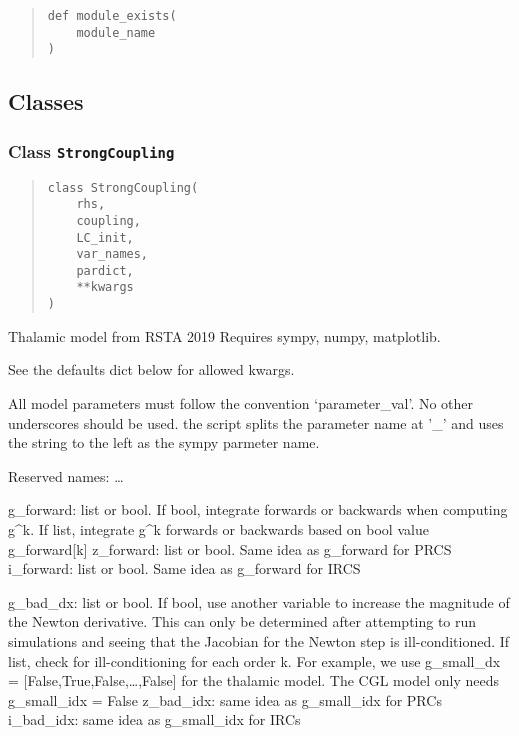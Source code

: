 \documentclass[
  english,
  a4paper,
  oneside]{article}
\begin{document}
\begin{quote}
\begin{verbatim}
def module_exists(
    module_name
)
\end{verbatim}
\end{quote}

\hypertarget{classes}{%
\subsection{Classes}\label{classes}}

\hypertarget{StrongCoupling.StrongCoupling}{%
\subsubsection{\texorpdfstring{Class
\texttt{StrongCoupling}}{Class StrongCoupling}}\label{StrongCoupling.StrongCoupling}}

\begin{quote}
\begin{verbatim}
class StrongCoupling(
    rhs,
    coupling,
    LC_init,
    var_names,
    pardict,
    **kwargs
)
\end{verbatim}
\end{quote}

Thalamic model from RSTA 2019 Requires sympy, numpy, matplotlib.

See the defaults dict below for allowed kwargs.

All model parameters must follow the convention `parameter\_val'. No
other underscores should be used. the script splits the parameter name
at '\_' and uses the string to the left as the sympy parmeter name.

Reserved names: \ldots{}

g\_forward: list or bool. If bool, integrate forwards or backwards when
computing g\^{}k. If list, integrate g\^{}k forwards or backwards based
on bool value g\_forward{[}k{]} z\_forward: list or bool. Same idea as
g\_forward for PRCS i\_forward: list or bool. Same idea as g\_forward
for IRCS

g\_bad\_dx: list or bool. If bool, use another variable to increase the
magnitude of the Newton derivative. This can only be determined after
attempting to run simulations and seeing that the Jacobian for the
Newton step is ill-conditioned. If list, check for ill-conditioning for
each order k. For example, we use g\_small\_dx =
{[}False,True,False,\ldots,False{]} for the thalamic model. The CGL
model only needs g\_small\_idx = False z\_bad\_idx: same idea as
g\_small\_idx for PRCs i\_bad\_idx: same idea as g\_small\_idx for IRCs
\end{document}
